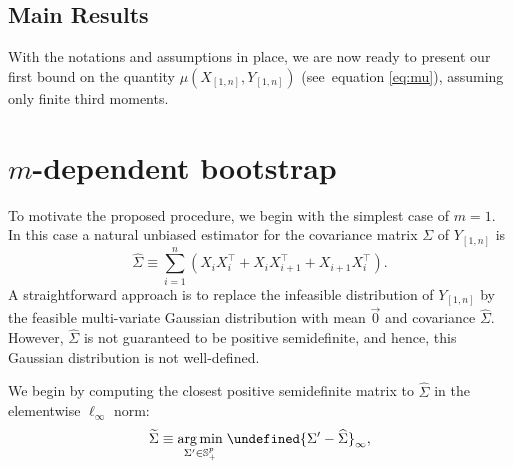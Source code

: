 \documentclass[10pt,a4paper]{amsart}
\theoremstyle{plain}
\theoremstyle{remark}
\def\hat#1{\widehat{#1}}
\def\tilde#1{\widetilde{#1}}
\let\norm\undefined %
\DeclarePairedDelimiter\norm{\lVert}{\rVert}
\begin{document}
\subsection{Main Results}\label{sec:main}

With the notations and assumptions in place, we are now ready to present our first bound on the quantity $\mu\left( X_{[1,n]}, Y_{[1,n]} \right)$ (see~equation \ref{eq:mu}),  assuming only finite third moments. 

\section{\texorpdfstring{$m$}{m}-dependent bootstrap} \label{sec:m_dep_bootstrap}

\setcounter{equation}{10}
To motivate the proposed procedure, we begin with the simplest case of $m=1$. In this case a natural unbiased estimator for the covariance matrix $\Sigma$ of $Y_{[1,n]}$ is 
\begin{equation} \label{eq:sigma_hat}
    \hat{\Sigma} 
    \equiv \sum_{i=1}^n \left( X_i X_i^\top 
    + X_i X_{i+1}^\top + X_{i+1} X_i^\top \right).
\end{equation}
A straightforward approach is to replace the infeasible distribution of $Y_{[1,n]}$ by the feasible multi-variate Gaussian distribution with mean $\vec{0}$ and covariance $\hat\Sigma$.
However, %
$\hat\Sigma$ is not guaranteed to be positive semidefinite, and hence, this Gaussian distribution is not well-defined. 

We begin by 
computing the closest positive semidefinite matrix to $\hat\Sigma$ in the elementwise $\ell_\infty$ norm:
\begin{equation} \label{eq:rho_tilde}
    \tilde\Sigma 
    \equiv \underset{\Sigma' \in \mathbb{S}_{+}^p}{\arg\min} \;\norm{\Sigma' - \hat\Sigma}_\infty,
\end{equation}
\end{document}
